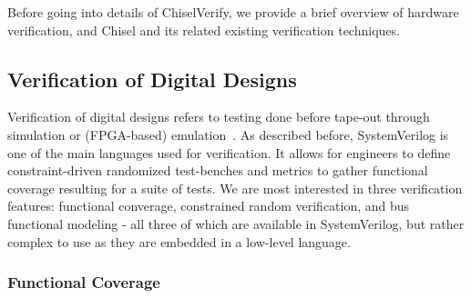 \documentclass[conference]{IEEEtran}
\begin{document}

Before going into details of ChiselVerify, we provide a brief overview of hardware verification, 
and Chisel and its related existing verification techniques.

\subsection{Verification of Digital Designs}

Verification of digital designs refers to testing done before tape-out through simulation 
or (FPGA-based) emulation~\cite{spear2008systemverilog}. As described before, SystemVerilog is one 
of the main languages used for verification. It allows for engineers to define constraint-driven 
randomized test-benches and metrics to gather functional coverage resulting for a suite of 
tests. We are most interested in three verification features: functional converage, 
constrained random verification, and bus functional modeling - all three of which are available in 
SystemVerilog, but rather complex to use as they are embedded in a low-level language.

\subsubsection{Functional Coverage}
\end{document}

